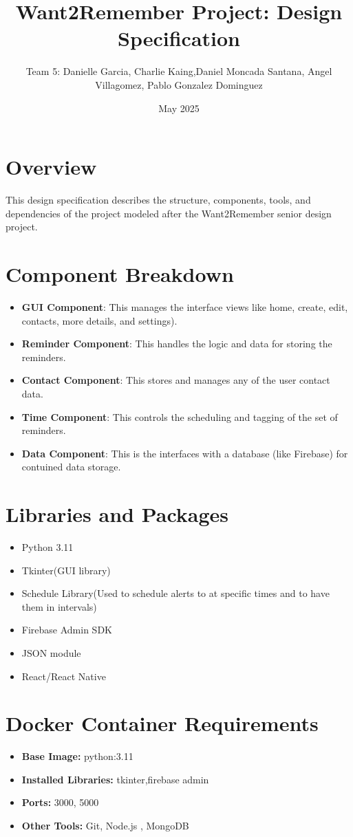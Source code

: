 \documentclass{article}
\title{Want2Remember Project: Design Specification}
\author{Team 5: Danielle Garcia, Charlie Kaing,Daniel Moncada Santana, 
Angel Villagomez, Pablo Gonzalez Dominguez}
\date{May 2025}
\begin{document}
\maketitle

\section*{Overview}
This design specification describes the structure, components, tools, and dependencies of the project modeled after the Want2Remember senior design project.

\section*{Component Breakdown}
\begin{itemize}
\item \textbf{GUI Component}: This manages the interface views like home, create, edit, contacts, more details, and settings).
\item \textbf{Reminder Component}: This handles the logic and data for storing the reminders.
\item \textbf{Contact Component}: This stores and manages any of the user contact data.
\item \textbf{Time Component}: This controls the scheduling and tagging of the set of reminders.
\item \textbf{Data Component}: This is the interfaces with a database (like Firebase) for contuined data storage.
\end{itemize}

\section*{Libraries and Packages}
\begin{itemize}
\item Python 3.11
\item Tkinter(GUI library)
\item Schedule Library(Used to schedule alerts to at specific times and to have them in intervals)
\item Firebase Admin SDK 
\item JSON module 
\item React/React Native 

\end{itemize}

\section*{Docker Container Requirements}
\begin{itemize}
\item \textbf{Base Image:} python:3.11
\item \textbf{Installed Libraries:} tkinter,firebase admin
\item \textbf{Ports:} 3000, 5000 
\item \textbf{Other Tools:} Git, Node.js , MongoDB 
\end{itemize}
\end{document}
